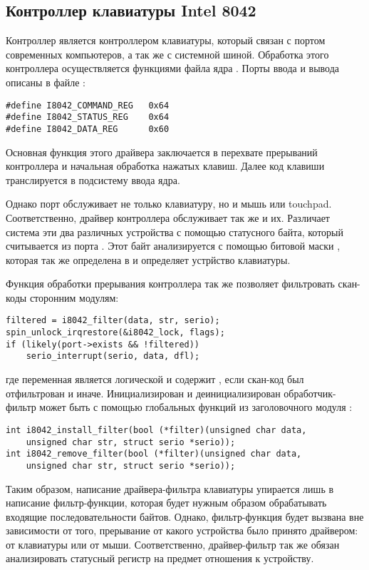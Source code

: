 \subsection{Контроллер клавиатуры Intel 8042}
Контроллер  является контроллером клавиатуры, который связан с портом  современных 
компьютеров, а так же с системной шиной. Обработка этого контроллера осуществляется функциями файла
 ядра \linux. Порты ввода и вывода описаны в файле 
:
\begin{lstlisting}
#define I8042_COMMAND_REG	0x64
#define I8042_STATUS_REG	0x64
#define I8042_DATA_REG		0x60
\end{lstlisting}

Основная функция этого драйвера заключается в перехвате прерываний контроллера и начальная обработка 
нажатых клавиш. Далее код клавиши транслируется в подсистему ввода ядра.
\newpar

Однако порт  обслуживает не только клавиатуру, но и мышь или touchpad. 
Соответственно, драйвер контроллера  обслуживает так же и их. Различает система
эти два различных устройства с помощью статусного байта, который считывается из порта 
. Этот байт анализируется с помощью битовой маски
, которая так же определена в  и определяет 
устрйство клавиатуры.
\newpar

Функция обработки прерывания контроллера так же позволяет фильтровать скан-коды сторонним
модулям:
\begin{lstlisting}
filtered = i8042_filter(data, str, serio);
spin_unlock_irqrestore(&i8042_lock, flags);
if (likely(port->exists && !filtered))
	serio_interrupt(serio, data, dfl);
\end{lstlisting}
где переменная  является логической и содержит , если скан-код
был отфильтрован и  иначе.
Инициализирован и деинициализирован обработчик-фильтр может быть с помощью глобальных функций из
заголовочного модуля :
\begin{lstlisting}
int i8042_install_filter(bool (*filter)(unsigned char data, 
	unsigned char str, struct serio *serio));
int i8042_remove_filter(bool (*filter)(unsigned char data, 
	unsigned char str, struct serio *serio));
\end{lstlisting}
Таким образом, написание драйвера-фильтра клавиатуры упирается лишь в написание
фильтр-функции, которая будет нужным образом обрабатывать входящие последовательности байтов.
Однако, фильтр-функция будет вызвана вне зависимости от того, прерывание от какого устройства
было принято драйвером: от клавиатуры или от мыши. Соответственно, драйвер-фильтр так же
обязан анализировать статусный регистр на предмет отношения к устройству.

